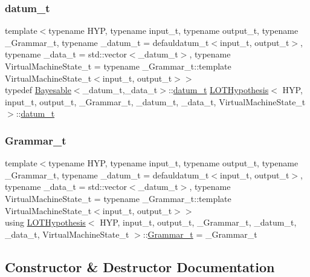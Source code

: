 \subsubsection{\texorpdfstring{datum\+\_\+t}{datum\_t}}
{\footnotesize\ttfamily template$<$typename H\+YP, typename input\+\_\+t, typename output\+\_\+t, typename \+\_\+\+Grammar\+\_\+t, typename \+\_\+datum\+\_\+t = defauldatum\+\_\+t$<$input\+\_\+t, output\+\_\+t$>$, typename \+\_\+data\+\_\+t = std\+::vector$<$\+\_\+datum\+\_\+t$>$, typename Virtual\+Machine\+State\+\_\+t = typename \+\_\+\+Grammar\+\_\+t\+::template Virtual\+Machine\+State\+\_\+t$<$input\+\_\+t, output\+\_\+t$>$$>$ \\
typedef \hyperlink{class_bayesable}{Bayesable}$<$\+\_\+datum\+\_\+t,\+\_\+data\+\_\+t$>$\+::\hyperlink{class_l_o_t_hypothesis_ae36b1f113f45ee5ac82660028672739b}{datum\+\_\+t} \hyperlink{class_l_o_t_hypothesis}{L\+O\+T\+Hypothesis}$<$ H\+YP, input\+\_\+t, output\+\_\+t, \+\_\+\+Grammar\+\_\+t, \+\_\+datum\+\_\+t, \+\_\+data\+\_\+t, Virtual\+Machine\+State\+\_\+t $>$\+::\hyperlink{class_l_o_t_hypothesis_ae36b1f113f45ee5ac82660028672739b}{datum\+\_\+t}}

\mbox{\label{class_l_o_t_hypothesis_a8006204013d471860e54c49d19edbace}} 
\subsubsection{\texorpdfstring{Grammar\+\_\+t}{Grammar\_t}}
{\footnotesize\ttfamily template$<$typename H\+YP, typename input\+\_\+t, typename output\+\_\+t, typename \+\_\+\+Grammar\+\_\+t, typename \+\_\+datum\+\_\+t = defauldatum\+\_\+t$<$input\+\_\+t, output\+\_\+t$>$, typename \+\_\+data\+\_\+t = std\+::vector$<$\+\_\+datum\+\_\+t$>$, typename Virtual\+Machine\+State\+\_\+t = typename \+\_\+\+Grammar\+\_\+t\+::template Virtual\+Machine\+State\+\_\+t$<$input\+\_\+t, output\+\_\+t$>$$>$ \\
using \hyperlink{class_l_o_t_hypothesis}{L\+O\+T\+Hypothesis}$<$ H\+YP, input\+\_\+t, output\+\_\+t, \+\_\+\+Grammar\+\_\+t, \+\_\+datum\+\_\+t, \+\_\+data\+\_\+t, Virtual\+Machine\+State\+\_\+t $>$\+::\hyperlink{class_l_o_t_hypothesis_a8006204013d471860e54c49d19edbace}{Grammar\+\_\+t} =  \+\_\+\+Grammar\+\_\+t}



\subsection{Constructor \& Destructor Documentation}
\mbox{\label{class_l_o_t_hypothesis_a2c1ff366f7a839d9acae415823ceb112}} 

